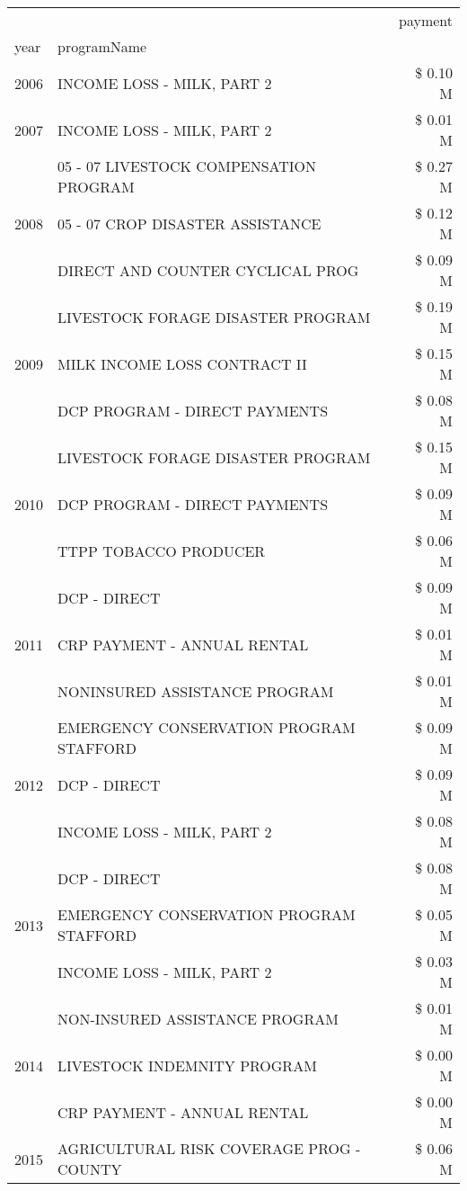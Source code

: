 \begin{tabular}{llr}
\toprule
 &  & payment \\
year & programName &  \\
\midrule
2006 & INCOME LOSS - MILK, PART 2 & \$ 0.10 M \\
\cline{1-3}
2007 & INCOME LOSS - MILK, PART 2 & \$ 0.01 M \\
\cline{1-3}
\multirow[t]{3}{*}{2008} & 05 - 07 LIVESTOCK COMPENSATION PROGRAM & \$ 0.27 M \\
 & 05 - 07 CROP DISASTER ASSISTANCE & \$ 0.12 M \\
 & DIRECT AND COUNTER CYCLICAL PROG & \$ 0.09 M \\
\cline{1-3}
\multirow[t]{3}{*}{2009} & LIVESTOCK FORAGE DISASTER  PROGRAM & \$ 0.19 M \\
 & MILK INCOME LOSS CONTRACT II & \$ 0.15 M \\
 & DCP PROGRAM - DIRECT PAYMENTS & \$ 0.08 M \\
\cline{1-3}
\multirow[t]{3}{*}{2010} & LIVESTOCK FORAGE DISASTER  PROGRAM & \$ 0.15 M \\
 & DCP PROGRAM - DIRECT PAYMENTS & \$ 0.09 M \\
 & TTPP TOBACCO PRODUCER & \$ 0.06 M \\
\cline{1-3}
\multirow[t]{3}{*}{2011} & DCP - DIRECT & \$ 0.09 M \\
 & CRP PAYMENT - ANNUAL RENTAL & \$ 0.01 M \\
 & NONINSURED ASSISTANCE PROGRAM & \$ 0.01 M \\
\cline{1-3}
\multirow[t]{3}{*}{2012} & EMERGENCY CONSERVATION PROGRAM STAFFORD & \$ 0.09 M \\
 & DCP - DIRECT & \$ 0.09 M \\
 & INCOME LOSS - MILK, PART 2 & \$ 0.08 M \\
\cline{1-3}
\multirow[t]{3}{*}{2013} & DCP - DIRECT & \$ 0.08 M \\
 & EMERGENCY CONSERVATION PROGRAM STAFFORD & \$ 0.05 M \\
 & INCOME LOSS - MILK, PART 2 & \$ 0.03 M \\
\cline{1-3}
\multirow[t]{3}{*}{2014} & NON-INSURED ASSISTANCE PROGRAM & \$ 0.01 M \\
 & LIVESTOCK INDEMNITY PROGRAM & \$ 0.00 M \\
 & CRP PAYMENT - ANNUAL RENTAL & \$ 0.00 M \\
\cline{1-3}
\multirow[t]{3}{*}{2015} & AGRICULTURAL RISK COVERAGE PROG - COUNTY & \$ 0.06 M \\

\end{tabular}
